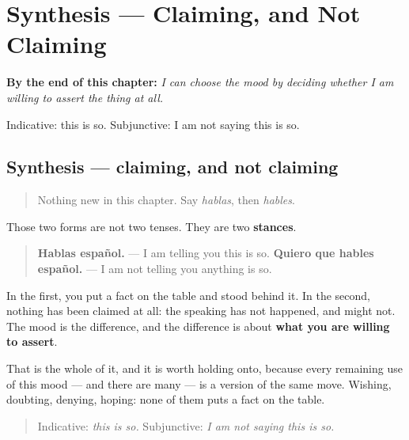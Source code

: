 
\chapter{Synthesis --- Claiming, and Not Claiming}
\label{ch:spanish-synthesis-subjuntivo}

\begin{chapteropening}
\textbf{By the end of this chapter:} \emph{I can choose the mood by deciding whether I am willing to assert the thing at all.}

Indicative: this is so. Subjunctive: I am not saying this is so.
\end{chapteropening}

\section[Practice]{Synthesis — claiming, and not claiming}

\label{lesson:ES-C18-sintesis-subjuntivo}



\begin{quote}
Nothing new in this chapter. Say \emph{hablas}, then \emph{hables}.
\end{quote}

\begin{grammarlens}[title={Grammar Lens: what the second one is actually doing}]
Those two forms are not two tenses. They are two \textbf{stances}.

\begin{quote}
\textbf{Hablas español.} — I am telling you this is so. \textbf{Quiero que hables español.} — I am not telling you anything is so.
\end{quote}

In the first, you put a fact on the table and stood behind it. In the second, nothing has been claimed at all: the speaking has not happened, and might not. The mood is the difference, and the difference is about \textbf{what you are willing to assert}.

That is the whole of it, and it is worth holding onto, because every remaining use of this mood — and there are many — is a version of the same move. Wishing, doubting, denying, hoping: none of them puts a fact on the table.

\begin{quote}
Indicative: \emph{this is so.} Subjunctive: \emph{I am not saying this is so.}
\end{quote}
\end{grammarlens}

